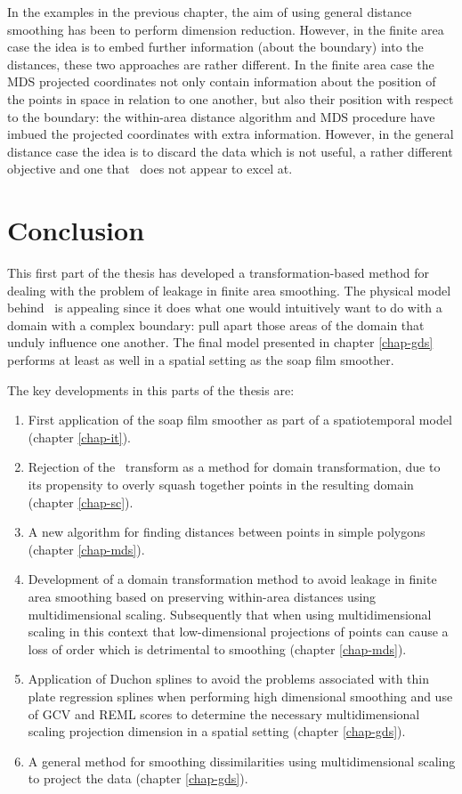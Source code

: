 In the examples in the previous chapter, the aim of using general distance smoothing has been to perform dimension reduction. However, in the finite area case the idea is to embed further information (about the boundary) into the distances, these two approaches are rather different. In the finite area case the MDS projected coordinates not only contain information about the position of the points in space in relation to one another, but also their position with respect to the boundary: the within-area distance algorithm and MDS procedure have imbued the projected coordinates with extra information. However, in the general distance case the idea is to discard the data which is not useful, a rather different objective and one that \mdsds\ does not appear to excel at.
\label{cor-r58} 

\section{Conclusion}

This first part of the thesis has developed a transformation-based method for dealing with the problem of leakage in finite area smoothing. The physical model behind \mdsds\ is appealing since it does what one would intuitively want to do with a domain with a complex boundary: pull apart those areas of the domain that unduly influence one another. The final model presented in chapter \ref{chap-gds} performs at least as well in a spatial setting as the soap film smoother.

The key developments in this parts of the thesis are:
\begin{enumerate}
\item First application of the soap film smoother as part of a spatiotemporal model (chapter \ref{chap-it}).
\item Rejection of the \sch\ transform as a method for domain transformation, due to its propensity to overly squash together points in the resulting domain (chapter \ref{chap-sc}).
\item A new algorithm for finding distances between points in simple polygons (chapter \ref{chap-mds}).
\item Development of a domain transformation method to avoid leakage in finite area smoothing based on preserving within-area distances using multidimensional scaling. Subsequently that when using multidimensional scaling in this context that low-dimensional projections of points can cause a loss of order which is detrimental to smoothing (chapter \ref{chap-mds}).
\item Application of Duchon splines to avoid the problems associated with thin plate regression splines when performing high dimensional smoothing and use of GCV and REML scores to determine the necessary multidimensional scaling projection dimension in a spatial setting (chapter \ref{chap-gds}).
\item A general method for smoothing dissimilarities using multidimensional scaling to project the data (chapter \ref{chap-gds}).
\end{enumerate}

